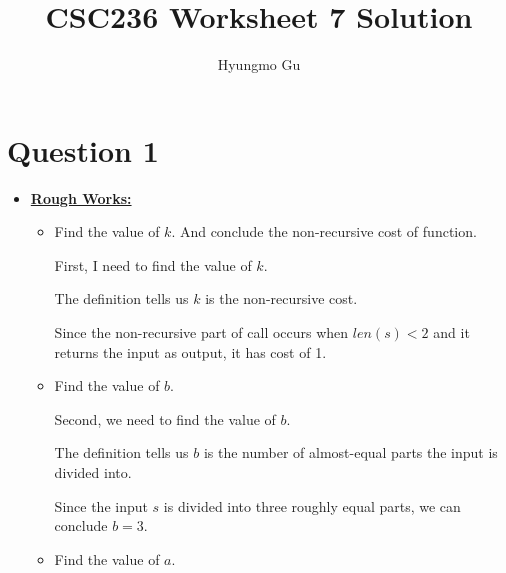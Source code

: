 \documentclass[12pt]{article}
\begin{document}
\title{CSC236 Worksheet 7 Solution}
\author{Hyungmo Gu}
\maketitle

\section*{Question 1}
\begin{itemize}
    \item

    \begin{mdframed}
    \underline{\textbf{Rough Works:}}

    \bigskip

    \begin{itemize}
        \item Find the value of $k$. And conclude the non-recursive cost of function.

        \bigskip

        First, I need to find the value of $k$.

        \begin{mdframed}
        The definition tells us $k$ is the non-recursive cost.

        \bigskip

        Since the non-recursive part of call occurs when $len(s) < 2$ and it
        returns the input as output, it has cost of 1.
        \end{mdframed}

        \item Find the value of $b$.

        \bigskip

        Second, we need to find the value of $b$.

        \bigskip

        \begin{mdframed}
        The definition tells us $b$ is the number of almost-equal parts the input
        is divided into.

        \bigskip

        Since the input $s$ is divided into three roughly equal parts, we can conclude $b = 3$.
        \end{mdframed}

        \item Find the value of $a$.

        \bigskip


\end{itemize}
\end{mdframed}
\end{itemize}
\end{document}
